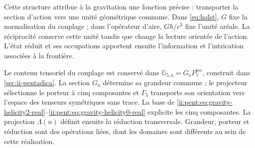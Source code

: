 Cette structure attribue à la gravitation une fonction précise :
transporter la section d'action vers une unité géométrique commune.
Dans \eqref{eq:holst}, \(G\) fixe la normalisation du couplage ;
dans l'opérateur d'aire, \(G\hbar/c^3\) fixe l'unité aréale.
La réciprocité conserve cette unité tandis que change la lecture
orientée de l'action. L'état réduit et ses occupations apportent
ensuite l'information et l'intrication associées à la frontière.

Le contenu tensoriel du couplage est conservé dans
\(\mathbb G_{5,a}=G_aP^{\mathrm{ico}}_5\), construit dans
\ref{sec:ii-pentadica}. La section \(G_a\) détermine sa grandeur commune ;
le projecteur sélectionne le porteur à cinq composantes et \(\Gamma_5\)
transporte son orientation vers l'espace des tenseurs symétriques sans trace.
La base de \eqref{ii:pent:eq:gravity-helicity2-real}--\eqref{ii:pent:eq:gravity-helicity0-real}
explicite les cinq composantes. La projection \(\Lambda(n)\) définit
ensuite la réduction transversale. Grandeur, porteur et réduction sont des
opérations liées, dont les domaines sont différents au sein de cette réalisation.
